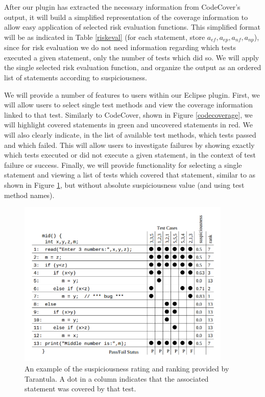 \documentclass[11pt]{article}
\begin{document}
After our plugin has extracted the necessary information from CodeCover's
output, it will build a simplified representation of the coverage information
to allow easy application of selected risk evaluation functions.  This 
simplified format will be as indicated in Table \ref{riskeval} (for each 
statement, store $a_{ef}, a_{ep}, a_{nf}, a_{np}$), since for risk evaluation
we do not need information regarding which tests executed a given statement,
only the number of tests which did so.  We will apply the single selected
risk evaluation function, and organize the output as an ordered list of
statements according to suspiciousness.  

We will provide a number of features to users within our Eclipse plugin.
First, we will allow users to select single test methods and view the 
coverage information linked to that test.  Similarly to CodeCover, shown in
Figure \ref{codecoverage}, we will highlight covered statements in green
and uncovered statements in red.  We will also clearly indicate, in the list
of available test methods, which tests passed and which failed.  This will
allow users to investigate failures by showing exactly which tests executed
or did not execute a given statement, in the context of test failure or success.
Finally, we will provide functionality for selecting a single statement and
viewing a list of tests which covered that statement, similar to as shown in
Figure  \ref{tarex}, but without absolute suspiciousness value (and using test
method names).

\begin{figure}[tpb]
  \centering
  \includegraphics[width=4in]{img/tar.png}
  \caption{An example of the suspiciousness rating and ranking provided
  by Tarantula.  A dot in a column indicates that the associated
  statement was covered by that test.}
  \label{tarex}
\end{figure}
\end{document}
